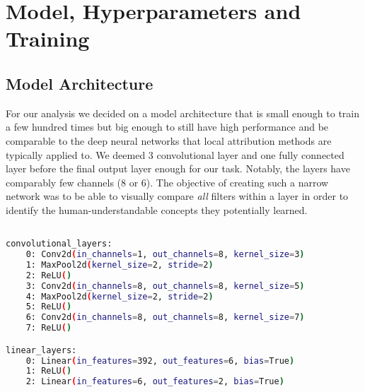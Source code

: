 \section{Model, Hyperparameters and Training}\label{appendix:model}
\subsection{Model Architecture}
For our analysis we decided on a model architecture that is small enough to train a few hundred times but big enough to still have high performance and be comparable to the deep neural networks that local attribution methods are typically applied to.
We deemed 3 convolutional layer and one fully connected layer before the final output layer enough for our task. Notably, the layers have comparably few channels (8 or 6). The objective of creating such a narrow network was to be able to visually compare \textit{all} filters within a layer in order to identify the human-understandable concepts they potentially learned. 

\begin{lstlisting}[language=bash, label=lst:cnnmodel]

convolutional_layers: 
    0: Conv2d(in_channels=1, out_channels=8, kernel_size=3)
    1: MaxPool2d(kernel_size=2, stride=2)
    2: ReLU()
    3: Conv2d(in_channels=8, out_channels=8, kernel_size=5)
    4: MaxPool2d(kernel_size=2, stride=2)
    5: ReLU()
    6: Conv2d(in_channels=8, out_channels=8, kernel_size=7)
    7: ReLU()

linear_layers:
    0: Linear(in_features=392, out_features=6, bias=True)
    1: ReLU()
    2: Linear(in_features=6, out_features=2, bias=True)  

\end{lstlisting}

